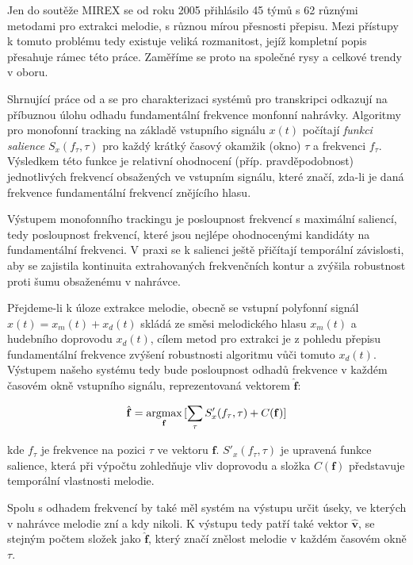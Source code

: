 Jen do soutěže MIREX se od roku 2005 přihlásilo 45 týmů s 62 různými metodami pro extrakci melodie, s různou mírou přesnosti přepisu. Mezi přístupy k tomuto problému tedy existuje veliká rozmanitost, jejíž kompletní popis přesahuje rámec této práce. Zaměříme se proto na společné rysy a celkové trendy v oboru. 

Shrnující práce od \cite{Poliner2007} a \cite{Salamon2014} se pro charakterizaci systémů pro transkripci odkazují na příbuznou úlohu odhadu fundamentální frekvence monfonní nahrávky. Algoritmy pro monofonní tracking na základě vstupního signálu $x(t)$ počítají \emph{funkci salience} $S_x(f_\tau, \tau)$ pro každý krátký časový okamžik (okno) $\tau$ a frekvenci $f_\tau$. Výsledkem této funkce je relativní ohodnocení (příp. pravděpodobnost) jednotlivých frekvencí obsažených ve vstupním signálu, které značí, zda-li je daná frekvence fundamentální frekvencí znějícího hlasu. 

Výstupem monofonního trackingu je posloupnost frekvencí s maximální saliencí, tedy posloupnost frekvencí, které jsou nejlépe ohodnocenými kandidáty na fundamentální frekvenci. V praxi se k salienci ještě přičítají temporální závislosti, aby se zajistila kontinuita extrahovaných frekvenčních kontur a zvýšila robustnost proti šumu obsaženému v nahrávce. 

Přejdeme-li k úloze extrakce melodie, obecně se vstupní polyfonní signál $x(t) = x_m(t) + x_d(t)$ skládá ze směsi melodického hlasu $x_m(t)$ a hudebního doprovodu $x_d(t)$, cílem metod pro extrakci je z pohledu přepisu fundamentální frekvence zvýšení robustnosti algoritmu vůči tomuto  $x_d(t)$. Výstupem našeho systému tedy bude posloupnost odhadů frekvence v každém časovém okně vstupního signálu, reprezentovaná vektorem $\hat{\mathbf{f}}$:

    $$\hat{\mathbf{f}} = \argmax_{\mathbf{f}}{[\sum_{\tau}{S'_x(f_\tau, \tau)} + C(\mathbf{f})]}$$

kde $f_\tau$ je frekvence na pozici $\tau$ ve vektoru $\mathbf{f}$. $S'_x(f_\tau, \tau)$ je upravená funkce salience, která při výpočtu zohledňuje vliv doprovodu a složka $C(\mathbf{f})$ představuje temporální vlastnosti melodie. 

Spolu s odhadem frekvencí by také měl systém na výstupu určit úseky, ve kterých v nahrávce melodie zní a kdy nikoli. K výstupu tedy patří také vektor $\hat{\mathbf{v}}$, se stejným počtem složek jako $\hat{\mathbf{f}}$, který značí znělost melodie v každém časovém okně $\tau$.


